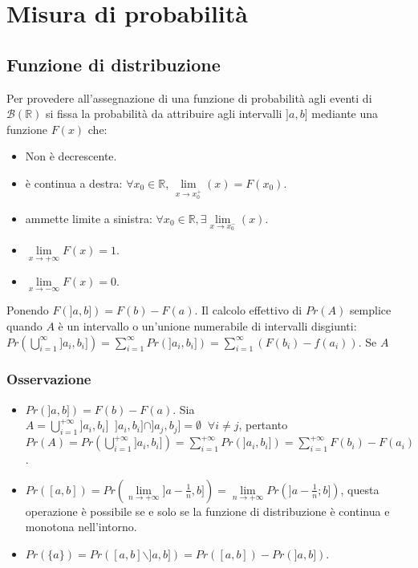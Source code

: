 \section{Misura di probabilit\`a}
\subsection{Funzione di distribuzione}
Per provedere all'assegnazione di una funzione di probabilit\`a agli eventi di $\mathcal{B}(\mathbb{R})$ si fissa la probabilit\`a da attribuire agli intervalli $]a,b]$ mediante una 
funzione $F(x)$ che:
\begin{itemize}
\item Non \`e decrescente.
\item \`e continua a destra: $\forall x_0\in\mathbb{R}$, $\lim\limits_{x\rightarrow x_0^+}(x)=F(x_0)$.
\item ammette limite a sinistra: $\forall x_0\in\mathbb{R}, \exists\lim\limits_{x\rightarrow x_0^-}(x)$.
\item $\lim\limits_{x\rightarrow+\infty}F(x)=1$.
\item $\lim\limits_{x\rightarrow-\infty}F(x)=0$.
\end{itemize}
Ponendo $F(]a,b])=F(b)-F(a)$. Il calcolo effettivo di $Pr(A)$ semplice quando $A$ \`e un intervallo o un'unione numerabile di intervalli disgiunti:
$Pr(\bigcup\limits_{i=1}^\infty]a_i,b_i])=\sum\limits_{i=1}^\infty Pr(]a_i,b_i])=\sum\limits_{i=1}^\infty(F(b_i)-f(a_i))$. Se $A$
\subsubsection{Osservazione}
\begin{itemize}
\item $Pr(]a,b])=F(b)-F(a)$. Sia $A=\bigcup\limits_{i=1}^{+\infty}]a_i,b_i]\;\;]a_i,b_i]\cap]a_j,b_j]=\emptyset\;\;\forall i\neq j$, pertanto $Pr(A)=Pr(\bigcup\limits_{i=1}^{+\infty}]a_i,b_i])=\sum\limits_{i=1}^{+\infty}Pr(]a_i,b_i])=\sum\limits_{i=1}^{+\infty}F(b_i)-F(a_i)$.
\item $Pr([a,b])=Pr(\lim\limits_{n\rightarrow+\infty} ]a-\frac{1}{n}, b])=\lim\limits_{n\rightarrow+\infty}Pr(]a-\frac{1}{n};b])$, questa operazione \`e possibile se e solo se 
la funzione di distribuzione \`e continua e monotona nell'intorno. 
\item $Pr(\{a\})=Pr([a,b]\backslash]a,b])=Pr([a,b])-Pr(]a,b])$. 
\end{itemize}


